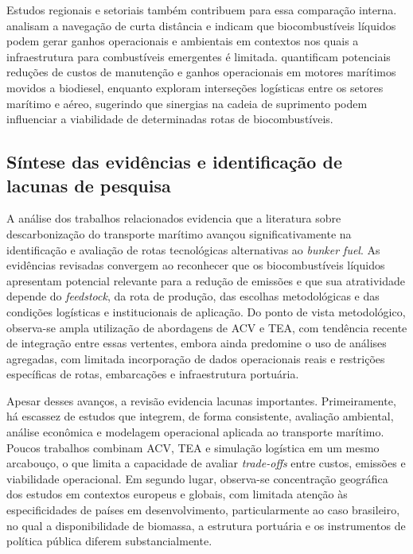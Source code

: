 Estudos regionais e setoriais também contribuem para essa comparação interna. \citet{spoof-tuomi_environmental_2020} analisam a navegação de curta distância e indicam que biocombustíveis líquidos podem gerar ganhos operacionais e ambientais em contextos nos quais a infraestrutura para combustíveis emergentes é limitada. \citet{sagin_impact_2023} quantificam potenciais reduções de custos de manutenção e ganhos operacionais em motores marítimos movidos a biodiesel, enquanto \citet{doliente_bio-aviation_2020} exploram interseções logísticas entre os setores marítimo e aéreo, sugerindo que sinergias na cadeia de suprimento podem influenciar a viabilidade de determinadas rotas de biocombustíveis.

\subsection{Síntese das evidências e identificação de lacunas de pesquisa}
A análise dos trabalhos relacionados evidencia que a literatura sobre descarbonização do transporte marítimo avançou significativamente na identificação e avaliação de rotas tecnológicas alternativas ao \emph{bunker fuel}. As evidências revisadas convergem ao reconhecer que os biocombustíveis líquidos apresentam potencial relevante para a redução de emissões e que sua atratividade depende do \emph{feedstock}, da rota de produção, das escolhas metodológicas e das condições logísticas e institucionais de aplicação. Do ponto de vista metodológico, observa-se ampla utilização de abordagens de \gls{ACV} e \gls{TEA}, com tendência recente de integração entre essas vertentes, embora ainda predomine o uso de análises agregadas, com limitada incorporação de dados operacionais reais e restrições específicas de rotas, embarcações e infraestrutura portuária.

Apesar desses avanços, a revisão evidencia lacunas importantes. Primeiramente, há escassez de estudos que integrem, de forma consistente, avaliação ambiental, análise econômica e modelagem operacional aplicada ao transporte marítimo. Poucos trabalhos combinam \gls{ACV}, \gls{TEA} e simulação logística em um mesmo arcabouço, o que limita a capacidade de avaliar \emph{trade-offs} entre custos, emissões e viabilidade operacional. Em segundo lugar, observa-se concentração geográfica dos estudos em contextos europeus e globais, com limitada atenção às especificidades de países em desenvolvimento, particularmente ao caso brasileiro, no qual a disponibilidade de biomassa, a estrutura portuária e os instrumentos de política pública diferem substancialmente.

